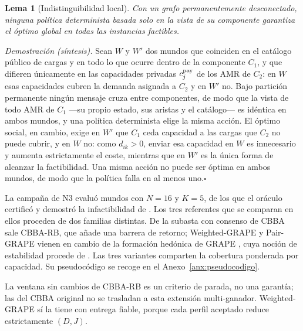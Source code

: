 \documentclass[12pt,a4paper]{article}
\newtheorem{n1lema}{Lema}
\theoremstyle{remark}
\theoremstyle{plain}
\newcommand{\proofsketch}[1]{%
  {\small\textit{Demostración (síntesis).} #1\hfill$\square$\par}
}
\begin{document}
\begin{n1lema}[Indistinguibilidad local]
Con un grafo permanentemente desconectado, ninguna política determinista basada
solo en la vista de su componente garantiza el óptimo global en todas las
instancias factibles.
\end{n1lema}
\proofsketch{Sean $W$ y $W'$ dos mundos que coinciden en el catálogo público de
cargas y en todo lo que ocurre dentro de la componente $C_1$, y que difieren
únicamente en las capacidades privadas $c_j^{\rm pay}$ de los AMR de $C_2$: en $W$
esas capacidades cubren la demanda asignada a $C_2$ y en $W'$ no. Bajo partición
permanente ningún mensaje cruza entre componentes, de modo que la vista de todo
AMR de $C_1$ ---su propio estado, sus aristas y el catálogo--- es idéntica en
ambos mundos, y una política determinista elige la misma acción. El óptimo social,
en cambio, exige en $W'$ que $C_1$ ceda capacidad a las cargas que $C_2$ no puede
cubrir, y en $W$ no: como $d_{ik}>0$, enviar esa capacidad en $W$ es innecesario
y aumenta estrictamente el coste, mientras que en $W'$ es la única forma de
alcanzar la factibilidad. Una misma acción no puede ser óptima en ambos mundos,
de modo que la política falla en al menos uno.}

La campaña de N3 evaluó \NThreeWorlds{} mundos con $N=16$ y $K=5$, de los que el
oráculo certificó \NThreeOracleCertified{} y demostró la infactibilidad de
\NThreeOracleInfeasible. Los tres referentes que se comparan en ellos proceden de
dos familias distintas. De la subasta con consenso de CBBA
\citep{choiBrunetHow2009CBBA,johnson2011acbba} sale CBBA-RB, que añade una barrera
de retorno; Weighted-GRAPE y Pair-GRAPE vienen en
cambio de la formación hedónica de GRAPE \citep{jangShinTsourdos2018GRAPE,dutta2021hedonic},
cuya noción de estabilidad procede de \citet{bogomolnaiaJackson2002Hedonic}.
Las tres variantes comparten
la cobertura ponderada por capacidad. Su pseudocódigo se recoge en el
Anexo~\ref{anx:pseudocodigo}.


{\footnotesize La ventana sin cambios de CBBA-RB es un criterio de parada, no una
garantía; las del CBBA original no se trasladan a esta extensión multi-ganador.
Weighted-GRAPE sí la tiene con entrega fiable, porque cada perfil aceptado reduce
estrictamente $(D,J)$.}


\end{document}
